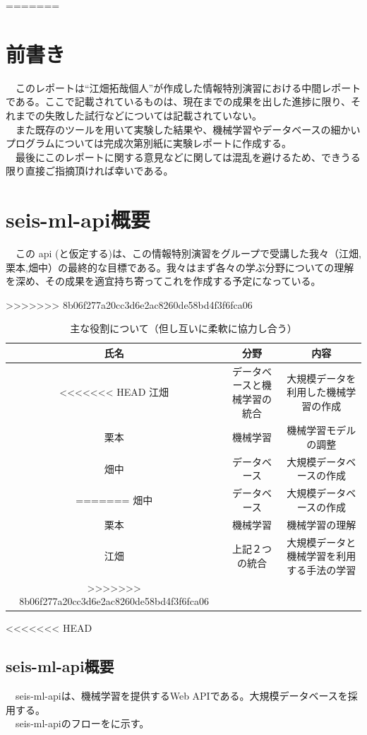 \documentclass{scrartcl}
\begin{document}
\begin{table}[htbp]
\caption{演習範囲に関して}
=======
\section{前書き}
\label{sec:org470ddd7}
　このレポートは``江畑拓哉個人''が作成した情報特別演習における中間レポートである。ここで記載されているものは、現在までの成果を出した進捗に限り、それまでの失敗した試行などについては記載されていない。\\
　また既存のツールを用いて実験した結果や、機械学習やデータベースの細かいプログラムについては完成次第別紙に実験レポートに作成する。\\
　最後にこのレポートに関する意見などに関しては混乱を避けるため、できうる限り直接ご指摘頂ければ幸いである。\\
\section{seis-ml-api概要}
\label{sec:orgd866fc1}
　この api (と仮定する)は、この情報特別演習をグループで受講した我々（江畑,栗本,畑中）の最終的な目標である。我々はまず各々の学ぶ分野についての理解を深め、その成果を適宜持ち寄ってこれを作成する予定になっている。\\

\begin{table}[htbp]
\caption{主な役割について（但し互いに柔軟に協力し合う）}
>>>>>>> 8b06f277a20cc3d6e2ac8260de58bd4f3f6fca06
\centering
\begin{tabular}{|c|c|c|}
\hline
氏名 & 分野 & 内容\\
\hline
<<<<<<< HEAD
江畑 & データベースと機械学習の統合 & 大規模データを利用した機械学習の作成\\
\hline
栗本 & 機械学習 & 機械学習モデルの調整\\
\hline
畑中 & データベース & 大規模データベースの作成\\
=======
畑中 & データベース & 大規模データベースの作成\\
\hline
栗本 & 機械学習 & 機械学習の理解\\
\hline
江畑 & 上記２つの統合 & 大規模データと機械学習を利用する手法の学習\\
>>>>>>> 8b06f277a20cc3d6e2ac8260de58bd4f3f6fca06
\hline
\end{tabular}
\end{table}

<<<<<<< HEAD
\subsection{seis-ml-api概要}
\label{sec:orgd312151}
　seis-ml-apiは、機械学習を提供するWeb APIである。大規模データベースを採用する。\\
　seis-ml-apiのフローをに示す。\\


\end{table}
\end{document}
